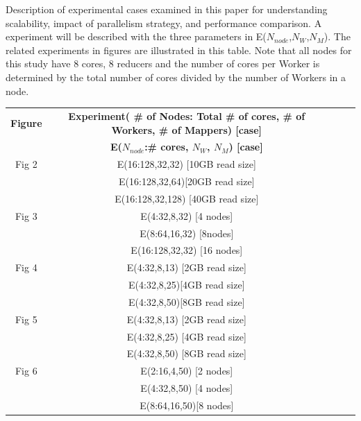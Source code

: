 \documentclass{acm_proc_article-sp}
\begin{document}
\begin{center}
\begin{table}[ht]
 \caption{Description of experimental cases examined in this paper for understanding scalability, impact of parallelism strategy, and performance comparison.  A experiment will be described with the three parameters in E($N_{node}$,$N_W$,$N_M$).  The related experiments in figures are illustrated in this table.  Note that all nodes for this study have 8 cores, 8 reducers and the number of cores per Worker is determined by the total number of cores divided by the number of Workers in a node.}
    \label{table:exp-description} 
\end{table}
\end{center}


\begin{center}
\begin{table}[ht]
\small
\hfill{}
 \begin{tabular}{|c|c|c|c|c|} 
 \hline 
 \textbf{Figure} &  \textbf{Experiment( \# of  Nodes: Total \# of cores, \# of Workers, \# of Mappers) [case]}  \\
&\textbf{E($N_{node}$:\# cores, $N_W$,  $N_M$) [case]}  \\
 \hline
  \hline
Fig 2 & E(16:128,32,32) [10GB read size] \\
&E(16:128,32,64)[20GB read size]\\
&E(16:128,32,128) [40GB read size]\\
\hline
Fig 3 & E(4:32,8,32) [4 nodes]\\
&E(8:64,16,32) [8nodes]\\
&E(16:128,32,32) [16 nodes]\\
\hline
Fig 4& E(4:32,8,13) [2GB read size] \\
&E(4:32,8,25)[4GB read size]\\
&E(4:32,8,50)[8GB read size] \\
\hline
Fig 5& E(4:32,8,13) [2GB read size]\\
&E(4:32,8,25) [4GB read size] \\
&E(4:32,8,50) [8GB read size] \\
\hline
Fig 6 &E(2:16,4,50) [2 nodes] \\
&E(4:32,8,50) [4 nodes] \\
&E(8:64,16,50)[8 nodes]\\
 \hline
 \end{tabular}
 \hfill{}
\end{table}
\end{center}


\end{document}
